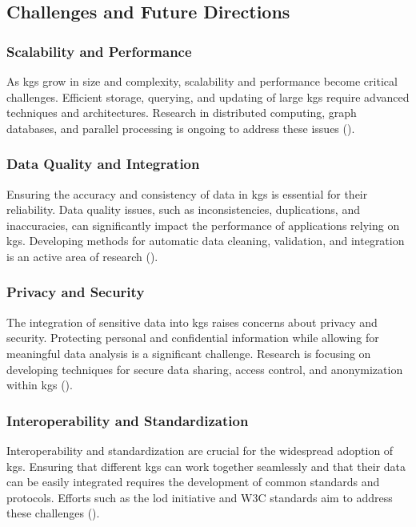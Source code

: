 \subsection*{Challenges and Future Directions}

\subsubsection*{Scalability and Performance}
As \glspl{kg} grow in size and complexity, scalability and performance become critical challenges. Efficient storage, querying, and updating of large \glspl{kg} require advanced techniques and architectures. Research in distributed computing, graph databases, and parallel processing is ongoing to address these issues (\cite{Chaudhri2022}).

\subsubsection*{Data Quality and Integration}

Ensuring the accuracy and consistency of data in \glspl{kg} is essential for their reliability. Data quality issues, such as inconsistencies, duplications, and inaccuracies, can significantly impact the performance of applications relying on \glspl{kg}. Developing methods for automatic data cleaning, validation, and integration is an active area of research (\cite{Paulheim2017}).

\subsubsection*{Privacy and Security}

The integration of sensitive data into \glspl{kg} raises concerns about privacy and security. Protecting personal and confidential information while allowing for meaningful data analysis is a significant challenge. Research is focusing on developing techniques for secure data sharing, access control, and anonymization within \glspl{kg} (\cite{Bonatti2017}).

\subsubsection*{Interoperability and Standardization}

Interoperability and standardization are crucial for the widespread adoption of \glspl{kg}. Ensuring that different \glspl{kg} can work together seamlessly and that their data can be easily integrated requires the development of common standards and protocols. Efforts such as the \gls{lod} initiative and W3C standards aim to address these challenges (\cite{Bizer2023}).

